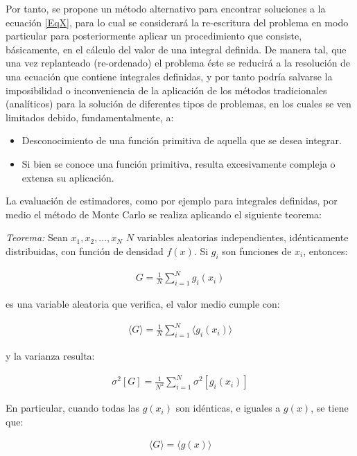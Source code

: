 Por tanto, se propone un m\'etodo alternativo para encontrar soluciones a la ecuaci\'on \ref{EqX}, para lo cual se considerar\'a la 
re-escritura del problema en modo particular para posteriormente aplicar un procedimiento que consiste, b\'asicamente, en el c\'alculo 
del valor de una integral definida. 
%
De manera tal, que una vez replanteado (re-ordenado) el problema \'este se reducir\'a a la resoluci\'on de una ecuaci\'on que contiene 
integrales definidas, y por tanto podr\'ia salvarse la imposibilidad o inconveniencia de la aplicaci\'on de 
los m\'etodos tradicionales (anal\'iticos) para la soluci\'on de diferentes tipos de problemas, en los cuales se ven limitados debido, 
fundamentalmente, a:
\begin{itemize}
 \item Desconocimiento de una funci\'on primitiva de aquella que se desea integrar.
 \item Si bien se conoce una funci\'on primitiva, resulta excesivamente compleja o extensa su aplicaci\'on.
\end{itemize}

La evaluaci\'on de estimadores, como por ejemplo para integrales definidas, por medio el m\'etodo de Monte Carlo se realiza aplicando el
siguiente teorema:

\textsl{Teorema:} Sean $x_{1}, x_{2}, ..., x_{N}$ $N$ variables aleatorias independientes, id\'enticamente distribuidas, con funci\'on 
de densidad $f(x)$. Si $g_{i}$ son funciones de $x_{i}$, entonces:

\begin{eqnarray}
 	G = \frac{1}{N} \sum_{i=1}^{N} g_{i}(x_{i})
 \label{EqZZZ1} 
\end{eqnarray}

es una variable aleatoria que verifica, el valor medio cumple con: 

\begin{eqnarray}
 	\langle G \rangle = \frac{1}{N} \sum_{i=1}^{N} \langle g_{i}(x_{i}) \rangle
 \label{EqZZZ2} 
\end{eqnarray}

y la varianza resulta:

\begin{eqnarray}
 	\sigma ^{2} [G] = \frac{1}{N^{2}} \sum_{i=1}^{N} \sigma ^{2} [g_{i}(x_{i})]
 \label{EqZZZ3} 
\end{eqnarray}

En particular, cuando todas las $g(x_{i})$ son id\'enticas, e iguales a $g(x)$, se tiene que:

\begin{eqnarray}
 	\langle G \rangle = \langle g(x) \rangle
 \label{EqZZZ4} 
\end{eqnarray}

